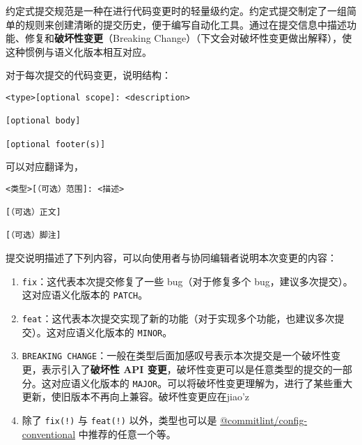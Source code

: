 
\begin{issues}
\issueDraft
\issueTODO
\end{issues}

约定式提交规范是一种在进行代码变更时的轻量级约定。约定式提交制定了一组简单的规则来创建清晰的提交历史，便于编写自动化工具。通过在提交信息中描述功能、修复和\textbf{破坏性变更}（Breaking Change）（下文会对破坏性变更做出解释），使这种惯例与语义化版本相互对应。

对于每次提交的代码变更，说明结构：
\begin{lstlisting}[language=none]
<type>[optional scope]: <description>

[optional body]

[optional footer(s)]
\end{lstlisting}
可以对应翻译为，
\begin{lstlisting}[language=none]
<类型>[（可选）范围]: <描述>

[（可选）正文]

[（可选）脚注]
\end{lstlisting}
提交说明描述了下列内容，可以向使用者与协同编辑者说明本次变更的内容：
\begin{enumerate}
\item \verb`fix`：这代表本次提交修复了一些 bug（对于修复多个 bug，建议多次提交）。这对应语义化版本的 \verb`PATCH`。
\item \verb`feat`：这代表本次提交实现了新的功能（对于实现多个功能，也建议多次提交）。这对应语义化版本的 \verb`MINOR`。
\item \verb`BREAKING CHANGE`：一般在类型后面加感叹号表示本次提交是一个破坏性变更，表示引入了\textbf{破坏性 API 变更}，破坏性变更可以是任意类型的提交的一部分。这对应语义化版本的 \verb`MAJOR`。可以将破坏性变更理解为，进行了某些重大更新，使旧版本不再向上兼容。破坏性变更应在jiao'z
\item 除了 \verb`fix(!)` 与 \verb`feat(!)` 以外，类型也可以是 \href{https://github.com/conventional-changelog/commitlint/tree/master/%40commitlint/config-conventional}{@commitlint/config-conventional} 中推荐的任意一个等。
\end{enumerate}
